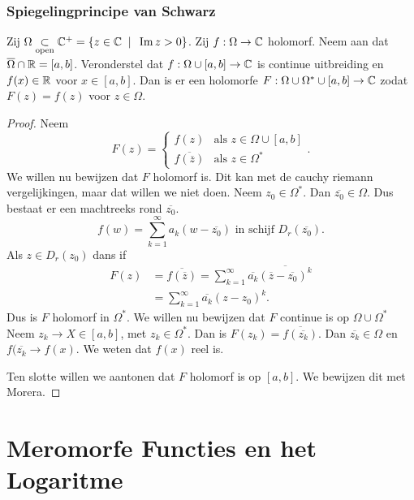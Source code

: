 
\subsection{Spiegelingprincipe van Schwarz} \label{sec:spiegelingprincipe_van_schwarz}
\begin{stelling}	
Zij $\Omega \open \C^{+} = \{z \in \C \st \im z > 0\} $. 
Zij $f: \Omega \to \mathbb{C}$ holomorf. Neem aan dat $\overline{\Omega}\cap \mathbb{R} = [a, b]$. 
Veronderstel dat $f: \Omega\cup [a, b] \to \mathbb{C}$ is continue uitbreiding en $f(x) \in \mathbb{R}$ voor $x \in [a, b]$.
Dan is er een holomorfe  $F:\Omega \cup \Omega^*\cup [a, b] \to \mathbb{C}$ zodat $F(z) = f(z) $ voor $z \in \Omega$. 
\end{stelling}
\begin{proof}
	Neem \[
		F(z) = \begin{cases}
			f(z) & \text{als }z \in \Omega \cup [a, b] \\
			\overline{f(\overline{z})} & \text{als } z \in \Omega^* 
		\end{cases}
	.\] 
	We willen nu bewijzen dat $F$ holomorf is. Dit kan met de cauchy riemann vergelijkingen, maar dat willen we niet doen.
	Neem $z_0 \in \Omega^*$. Dan $\overline{z_0} \in \Omega$. 
	Dus bestaat er een machtreeks rond $\overline{z_0}$. 
	\[
		f(w) = \sum_{k=1}^{\infty} a_k (w - \overline{z_0}) \text{ in schijf } D_r(\overline{z_0})
	.\] 
	Als $z \in D_r(z_0)$ dans if 
	\begin{align*}
		F(z) &= \overline{f(\overline{z})} = \sum_{k = 1}^{\infty} \overline{a_k}\overline{(\overline{z}- \overline{z_0})^{k}} \\
		     &= \sum_{k = 1}^{\infty} \overline{a_k}(z - z_0)^{k}
	.\end{align*}
	Dus is $F$ holomorf in $\Omega^*$.
	We willen nu bewijzen dat $F$ continue is op $\Omega \cup \Omega^*$
	Neem $z_k \to X \in [a, b]$, met  $z_k \in \Omega^*$. Dan is  $F(z_k) = \overline{f(\overline{z_k})}$.
	Dan $\overline{z_k} \in \Omega$ en $f(\overline{z_k} \to f(x)$. We weten dat $f(x)$ reel is.

	Ten slotte willen we aantonen dat $F$ holomorf is op $[a,b]$. 
	We bewijzen dit met Morera.
\end{proof}

\chapter{Meromorfe Functies en het Logaritme} \label{chap:meromorfe_functies_en_het_logaritme}
